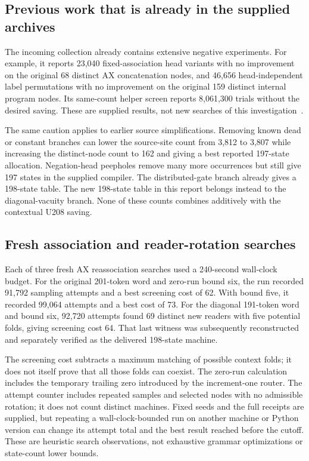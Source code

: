 \subsection{Previous work that is already in the supplied archives}

The incoming collection already contains extensive negative experiments.
For example, it reports 23,040 fixed-association head variants with no
improvement on the original 68 distinct AX concatenation nodes, and
46,656 head-independent label permutations with no improvement on the
original 159 distinct internal program nodes. Its same-count helper
screen reports 8,061,300 trials without the desired saving. These are
supplied results, not new searches of this investigation~\cite{incoming}.

The same caution applies to earlier source simplifications. Removing
known dead or constant branches can lower the source-site count from
3,812 to 3,807 while increasing the distinct-node count to 162 and giving
a best reported 197-state allocation. Negation-head peepholes remove
many more occurrences but still give 197 states in the supplied compiler.
The distributed-gate branch already gives a 198-state table. The new
198-state table in this report belongs instead to the diagonal-vacuity
branch. None of these counts combines additively with the contextual
U208 saving.

\subsection{Fresh association and reader-rotation searches}

Each of three fresh AX reassociation searches used a 240-second wall-clock
budget. For the original 201-token word and zero-run bound six, the run
recorded 91,792 sampling attempts and a best screening cost of 62.
With bound five, it recorded 99,064 attempts and a best cost of 73.
For the diagonal 191-token word and bound six, 92,720 attempts found
69 distinct new readers with five potential folds, giving screening
cost 64. That last witness was subsequently reconstructed and separately
verified as the delivered 198-state machine.

The screening cost subtracts a maximum matching of possible context folds;
it does not itself prove that all those folds can coexist. The zero-run
calculation includes the temporary trailing zero introduced by the
increment-one router. The attempt counter includes repeated samples and
selected nodes with no admissible rotation; it does not count distinct
machines. Fixed seeds and the full receipts are supplied, but repeating
a wall-clock-bounded run on another machine or Python version can change
its attempt total and the best result reached before the cutoff. These
are heuristic search observations, not exhaustive grammar optimizations
or state-count lower bounds.

